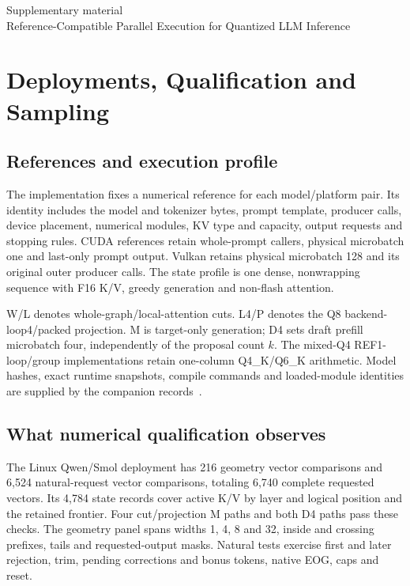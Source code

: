 \setcounter{section}{0}
\setcounter{dbltopnumber}{3}
\renewcommand{\thesection}{S\arabic{section}}
\setcounter{table}{0}
\setcounter{figure}{0}
\begin{center}
{\Large Supplementary material}\\[4pt]
{\normalsize Reference-Compatible Parallel Execution for Quantized LLM Inference}
\end{center}

\section{Deployments, Qualification and Sampling}
\subsection{References and execution profile}
The implementation fixes a numerical reference for each model/platform pair. Its identity includes the model and tokenizer bytes, prompt template, producer calls, device placement, numerical modules, KV type and capacity, output requests and stopping rules. CUDA references retain whole-prompt callers, physical microbatch one and last-only prompt output. Vulkan retains physical microbatch 128 and its original outer producer calls. The state profile is one dense, nonwrapping sequence with F16 K/V, greedy generation and non-flash attention.

W/L denotes whole-graph/local-attention cuts. L4/P denotes the Q8 backend-loop4/packed projection. M is target-only generation; D4 sets draft prefill microbatch four, independently of the proposal count $k$. The mixed-Q4 REF1-loop/group implementations retain one-column Q4\_K/Q6\_K arithmetic. Model hashes, exact runtime snapshots, compile commands and loaded-module identities are supplied by the companion records~\cite{records}.

\subsection{What numerical qualification observes}
The Linux Qwen/Smol deployment has 216 geometry vector comparisons and 6,524 natural-request vector comparisons, totaling 6,740 complete requested vectors. Its 4,784 state records cover active K/V by layer and logical position and the retained frontier. Four cut/projection M paths and both D4 paths pass these checks. The geometry panel spans widths 1, 4, 8 and 32, inside and crossing prefixes, tails and requested-output masks. Natural tests exercise first and later rejection, trim, pending corrections and bonus tokens, native EOG, caps and reset.

